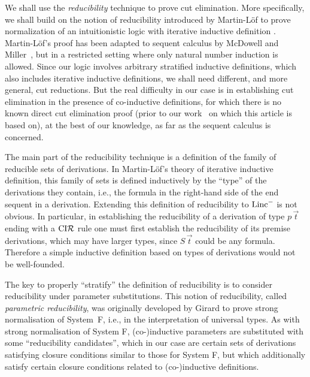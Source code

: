 \documentclass[preprint]{elsarticle}
\newcommand{\Linc}{{\rm Linc}^-}
\newcommand{\coindR}{{\rm CI}{\cal R}}
\begin{document}
We shall use the \emph{reducibility} technique to prove cut
elimination.  More specifically, we shall build on the notion of
reducibility introduced by Martin-L\"of to prove normalization of an
intuitionistic logic with iterative inductive definition
\cite{martin-lof71sls}.  Martin-L\"of's proof has been adapted to
sequent calculus by McDowell and Miller~\cite{mcdowell00tcs}, but in a
restricted setting where only natural number induction is
allowed. Since our logic involves arbitrary stratified inductive
definitions, which also includes iterative inductive definitions, we
shall need different, and more general, cut reductions. But the real
difficulty in our case is in establishing cut elimination in the
presence of co-inductive definitions, for which there is no known
direct cut elimination proof (prior to our work~\cite{Momigliano03TYPES} on which
this article is based on), at the best of our knowledge, as far as
the sequent calculus is concerned.

The main part of the reducibility technique is a definition of the
family of reducible sets of derivations.  In Martin-L\"of's theory of
iterative inductive definition, this family of sets is defined
inductively by the ``type'' of the derivations they contain, i.e., the
formula in the right-hand side of the end sequent in a
derivation. Extending this definition of reducibility to $\Linc$ is
not obvious.  In particular, in establishing the reducibility of a
derivation of type $p\,\vec t$ ending with a $\coindR$ rule
one must first establish the reducibility of its premise derivations,
which may have larger types, since $S\,\vec t$ could be any formula.
Therefore a simple inductive definition based on types of derivations
would not be well-founded.

The key to properly ``stratify'' the definition of reducibility is to
consider reducibility under parameter substitutions.  This notion of
reducibility, called \emph{parametric reducibility}, was originally
developed by Girard to prove strong normalisation of
System~F, i.e., in the interpretation of universal
types.  As with strong normalisation of System F, (co-)inductive
parameters are substituted with some ``reducibility candidates'',
which in our case are certain sets of derivations satisfying closure
conditions similar to those for System F, but which additionally
satisfy certain closure conditions related to (co-)inductive
definitions.
\end{document}
